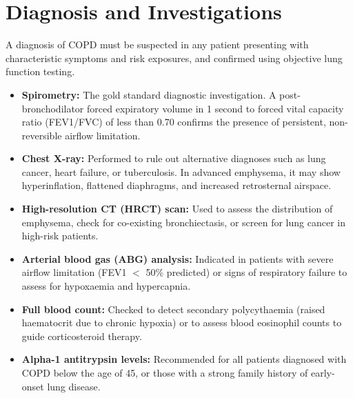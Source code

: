 \section*{Diagnosis and Investigations}
A diagnosis of COPD must be suspected in any patient presenting with characteristic symptoms and risk exposures, and confirmed using objective lung function testing.
\begin{itemize}
    \item \textbf{Spirometry:} The gold standard diagnostic investigation. A post-bronchodilator forced expiratory volume in 1 second to forced vital capacity ratio (FEV1/FVC) of less than 0.70 confirms the presence of persistent, non-reversible airflow limitation.
    \item \textbf{Chest X-ray:} Performed to rule out alternative diagnoses such as lung cancer, heart failure, or tuberculosis. In advanced emphysema, it may show hyperinflation, flattened diaphragms, and increased retrosternal airspace.
    \item \textbf{High-resolution CT (HRCT) scan:} Used to assess the distribution of emphysema, check for co-existing bronchiectasis, or screen for lung cancer in high-risk patients.
    \item \textbf{Arterial blood gas (ABG) analysis:} Indicated in patients with severe airflow limitation (FEV1 $<$ 50\% predicted) or signs of respiratory failure to assess for hypoxaemia and hypercapnia.
    \item \textbf{Full blood count:} Checked to detect secondary polycythaemia (raised haematocrit due to chronic hypoxia) or to assess blood eosinophil counts to guide corticosteroid therapy.
    \item \textbf{Alpha-1 antitrypsin levels:} Recommended for all patients diagnosed with COPD below the age of 45, or those with a strong family history of early-onset lung disease.
\end{itemize}

